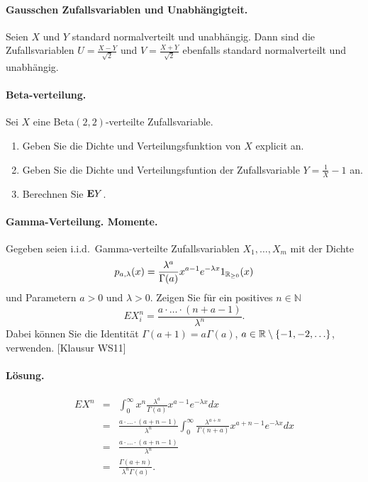\paragraph{Gausschen Zufallsvariablen und Unabhängigteit. } Seien $X$ und $Y$
standard normalverteilt und unabhängig. Dann sind die Zufallsvariablen $U =
\frac{X-Y}{\sqrt{2}}$ und $V=\frac{X+Y}{\sqrt{2}}$ ebenfalls standard
normalverteilt und unabhängig. 


\paragraph{Beta-verteilung.} Sei $X$ eine Beta$(2,2)$-verteilte Zufallsvariable.
\begin{enumerate}
    \item Geben Sie die Dichte und Verteilungsfunktion von $X$ explicit an. 
    \item Geben Sie die Dichte und Verteilungsfuntion der Zufallsvariable
        $Y = \frac{1}{X} - 1$ an. 
    \item Berechnen Sie $\mathbf{E} Y$.  
\end{enumerate}


\paragraph{Gamma-Verteilung. Momente.}
Gegeben seien i.i.d.\ Gamma-verteilte Zufallsvariablen $X_1,\ldots,X_m$ mit der Dichte
\begin{equation*}
    p_{a,\lambda}(x) = \frac{\lambda^a}{\Gamma(a)}x^{a-1}e^{-\lambda x} 1_{\mathbb R_{\geq 0}}(x)
\end{equation*}
und Parametern $a>0$ und $\lambda>0$.
Zeigen Sie für ein positives $n\in\mathbb N$
\begin{equation*}
    E X_i^n = \frac{a\cdot\ldots\cdot (n+a-1)}{\lambda^n}.
\end{equation*}
Dabei können Sie die Identität 
$\Gamma(a+1)=a \Gamma(a)$, $a\in\mathbb R \setminus \left\{ -1,-2,\ldots \right\}$, verwenden.
[Klausur WS11]

\paragraph*{Lösung.}
\begin{eqnarray}
    E X^n &=& \int_{0}^{\infty} x^n \frac{\lambda^a}{\Gamma(a)}x^{a-1}e^{-\lambda x} dx \\
    &=& \frac{a \cdot\ldots\cdot \left( a+n-1 \right)}{\lambda^n} 
    \int_{0}^{\infty} \frac{\lambda^{a+n}}{\Gamma(n+a)} x^{a+n-1} e^{-\lambda x} dx \\
    &=& \frac{a\cdot \ldots \cdot \left( a+n-1 \right)}{\lambda^n} \\
    &=& \frac{\Gamma\left( a+n \right)}{ \lambda^n \Gamma\left( a \right)}.
\end{eqnarray}


